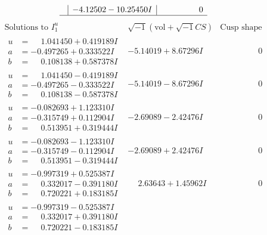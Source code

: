 \documentclass[1p]{elsarticle_modified}
\theoremstyle{definition}
\newcommand{\I}{\sqrt{-1}}
\begin{document}
$$\begin{array}{c|c|c}
 & -4.12502 - 10.25450 I & \phantom{-0.000000 } 0\\
 \hline 
 \end{array}$$\newpage$$\begin{array}{c|c|c}  
\text{Solutions to }I^u_{1}& \I (\text{vol} + \sqrt{-1}CS) & \text{Cusp shape}\\
 \hline 
\begin{aligned}
u &= \phantom{-}1.041450 + 0.419189 I \\
a &= -0.497265 + 0.333522 I \\
b &= \phantom{-}0.108138 + 0.587378 I\end{aligned}
 & -5.14019 + 8.67296 I & \phantom{-0.000000 } 0 \\ \hline\begin{aligned}
u &= \phantom{-}1.041450 - 0.419189 I \\
a &= -0.497265 - 0.333522 I \\
b &= \phantom{-}0.108138 - 0.587378 I\end{aligned}
 & -5.14019 - 8.67296 I & \phantom{-0.000000 } 0 \\ \hline\begin{aligned}
u &= -0.082693 + 1.123310 I \\
a &= -0.315749 + 0.112904 I \\
b &= \phantom{-}0.513951 + 0.319444 I\end{aligned}
 & -2.69089 - 2.42476 I & \phantom{-0.000000 } 0 \\ \hline\begin{aligned}
u &= -0.082693 - 1.123310 I \\
a &= -0.315749 - 0.112904 I \\
b &= \phantom{-}0.513951 - 0.319444 I\end{aligned}
 & -2.69089 + 2.42476 I & \phantom{-0.000000 } 0 \\ \hline\begin{aligned}
u &= -0.997319 + 0.525387 I \\
a &= \phantom{-}0.332017 - 0.391180 I \\
b &= \phantom{-}0.720221 + 0.183185 I\end{aligned}
 & \phantom{-}2.63643 + 1.45962 I & \phantom{-0.000000 } 0 \\ \hline\begin{aligned}
u &= -0.997319 - 0.525387 I \\
a &= \phantom{-}0.332017 + 0.391180 I \\
b &= \phantom{-}0.720221 - 0.183185 I\end{aligned}

\end{array}$$
\end{document}
